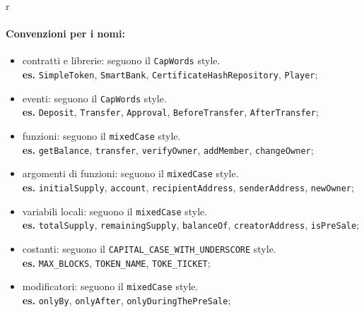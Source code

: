 r\documentclass[../ProcessiPrimari.tex]{subfiles}
\begin{document}
\paragraph*{Convenzioni per i nomi: }
\begin{itemize}
	\item contratti e librerie: seguono il \texttt{CapWords} style.\\
	\textbf{es.} \texttt{SimpleToken}, \texttt{SmartBank}, \texttt{CertificateHashRepository}, \texttt{Player};
	\item eventi: seguono il \texttt{CapWords} style.\\
	\textbf{es.} \texttt{Deposit}, \texttt{Transfer}, \texttt{Approval}, \texttt{BeforeTransfer}, \texttt{AfterTransfer};
	\item funzioni: seguono il \texttt{mixedCase} style.\\
	\textbf{es.} \texttt{getBalance}, \texttt{transfer}, \texttt{verifyOwner}, \texttt{addMember}, \texttt{changeOwner};
	\item argomenti di funzioni: seguono il \texttt{mixedCase} style.\\
	\textbf{es.} \texttt{initialSupply}, \texttt{account}, \texttt{recipientAddress}, \texttt{senderAddress}, \texttt{newOwner};
	\item variabili locali: seguono il \texttt{mixedCase} style.\\
	\textbf{es.} \texttt{totalSupply}, \texttt{remainingSupply}, \texttt{balanceOf}, \texttt{creatorAddress}, \texttt{isPreSale};
	\item costanti: seguono il \texttt{CAPITAL\_CASE\_WITH\_UNDERSCORE} style.\\
	\textbf{es.} \texttt{MAX\_BLOCKS}, \texttt{TOKEN\_NAME}, \texttt{TOKE\_TICKET};
	\item modificatori: seguono il \texttt{mixedCase} style.\\
	\textbf{es.} \texttt{onlyBy}, \texttt{onlyAfter}, \texttt{onlyDuringThePreSale};
\end{itemize}
\end{document}
